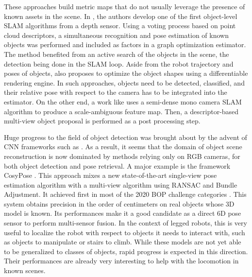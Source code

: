 These approaches build metric maps that do not usually leverage the presence of known assets in the scene. In \cite{SalasMoreno2013SLAMSL}, 
the authors develop one of the first object-level SLAM algorithms from a depth sensor. Using a voting process based on point cloud descriptors, 
a simultaneous recognition and pose estimation of known objects was performed and included as factors in a graph optimization estimator. 
The method benefited from an active search of the objects in the scene, the detection being done in the SLAM loop.
Aside from the robot trajectory and poses of objects, \cite{sucar2020nodeslam} also proposes to optimize the object shapes using a differentiable 
rendering engine. In such approaches, objects need to be detected, classified, and their relative pose with respect to the camera has to be integrated into the estimator. 
On the other end, a work like \cite{pillai2015monocular} uses a semi-dense mono camera SLAM algorithm to produce a scale-ambiguous feature map. 
Then, a descriptor-based multi-view object proposal is performed as a post processing step. 

Huge progress to the field of object detection was brought about by the advent of CNN frameworks such as \cite{he2018mask}. As a result, it seems that the domain of 
object scene reconstruction is now dominated by methods relying only on RGB cameras, for both object detection and pose retrieval. A major example is the framework CosyPose 
\cite{labbe2020cosypose}. This approach mixes a new state-of-the-art single-view pose estimation algorithm with a multi-view algorithm using RANSAC and Bundle Adjustment. 
It achieved first in most of the 2020 BOP challenge categories \cite{hodavn2020bop}. This system obtains precision in the order of centimeters on real objects whose 3D 
model is known. 
Its performances make it a good candidate as a direct 6D pose sensor to perform multi-sensor fusion. In the context of legged robots, this is very useful to localize the 
robot with respect to objects it needs to interact with, such as objects to manipulate or stairs to climb. 
While these models are not yet able to be generalized to classes of objects, rapid progress is expected in this direction. Their performances are already very interesting 
to help with the locomotion in known scenes.

